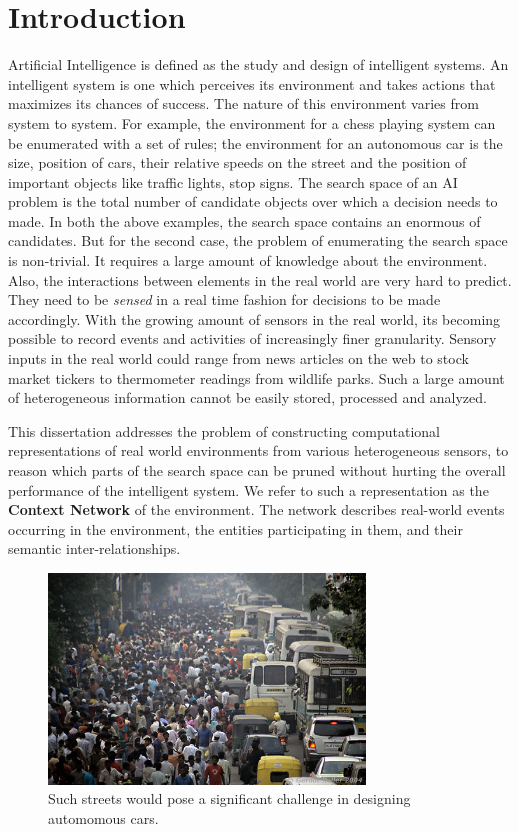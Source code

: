 \chapter{Introduction}

Artificial Intelligence is defined as the study and design of intelligent systems. An intelligent system is one which perceives its environment and takes actions that maximizes its chances of success. The nature of this environment varies from system to system. For example, the environment for a chess playing system can be enumerated with a set of rules; the environment for an autonomous car is the size, position of cars, their relative speeds on the street and the position of important objects like traffic lights, stop signs. The search space of an AI problem is the total number of candidate objects over which a decision needs to made. In both the above examples, the search space contains an enormous of candidates. But for the second case, the problem of enumerating the search space is non-trivial. It requires a large amount of knowledge about the environment. Also, the interactions between elements in the real world are very hard to predict. They need to be \textit{sensed} in a real time fashion for decisions to be made accordingly. With the growing amount of sensors in the real world, its becoming possible to record events and activities of increasingly finer granularity. Sensory inputs in the real world could range from news articles on the web to stock market tickers to thermometer readings from wildlife parks. Such a large amount of heterogeneous information cannot be easily stored, processed and analyzed. 

This dissertation addresses the problem of constructing computational representations of real world environments from various heterogeneous sensors, to reason which parts of the search space can be pruned without hurting the overall performance of the intelligent system. We refer to such a representation as the \textbf{Context Network} of the environment. The network describes real-world events occurring in the environment, the entities participating in them, and their semantic inter-relationships.

\begin{figure}[t]
\centering
\includegraphics[width=0.75\textwidth]{media/chapter1/india-streets.jpg}
\caption{Such streets would pose a significant challenge in designing automomous cars.}
\label{fig:india-streets}
\end{figure}

